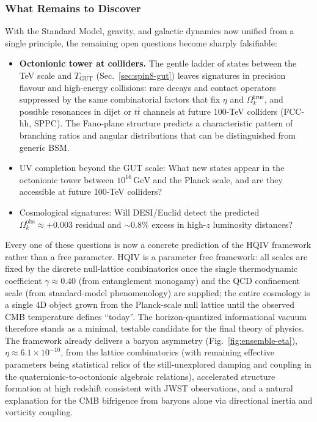 \documentclass[12pt,a4paper]{article}
\begin{document}
\subsubsection*{What Remains to Discover}

With the Standard Model, gravity, and galactic dynamics now unified from a single principle, the remaining open questions become sharply falsifiable:

\begin{itemize}
    \item \textbf{Octonionic tower at colliders.} The gentle ladder of states between the TeV scale and \(T_\mathrm{GUT}\) (Sec.~\ref{sec:spin8-gut}) leaves signatures in precision flavour and high-energy collisions: rare decays and contact operators suppressed by the same combinatorial factors that fix \(\eta\) and \(\Omega_k^\mathrm{true}\), and possible resonances in dijet or \(t\bar{t}\) channels at future 100-TeV colliders (FCC-hh, SPPC). The Fano-plane structure predicts a characteristic pattern of branching ratios and angular distributions that can be distinguished from generic BSM.
    \item UV completion beyond the GUT scale: What new states appear in the octonionic tower between \(10^{16}\,\mathrm{GeV}\) and the Planck scale, and are they accessible at future 100-TeV colliders?
    \item Cosmological signatures: Will DESI/Euclid detect the predicted \(\Omega_k^\mathrm{obs}\approx+0.003\) residual and \(\sim0.8\%\) excess in high-\(z\) luminosity distances?
\end{itemize}

Every one of these questions is now a concrete prediction of the HQIV framework rather than a free parameter. HQIV is a parameter free framework: all scales are fixed by the discrete null-lattice combinatorics once the single thermodynamic coefficient \(\gamma \approx 0.40\) (from entanglement monogamy) and the QCD confinement scale (from standard-model phenomenology) are supplied; the entire cosmology is a single 4D object grown from the Planck-scale null lattice until the observed CMB temperature defines ``today''. The horizon-quantized informational vacuum therefore stands as a minimal, testable candidate for the final theory of physics. The framework already delivers a baryon asymmetry (Fig.~\ref{fig:ensemble-eta}), \(\eta \approx 6.1 \times 10^{-10}\), from the lattice combinatorics (with remaining effective parameters being statistical relics of the still-unexplored damping and coupling in the quaternionic-to-octonionic algebraic relations), accelerated structure formation at high redshift consistent with JWST observations, and a natural explanation for the CMB bifrigence from baryons alone via directional inertia and vorticity coupling.
\end{document}
